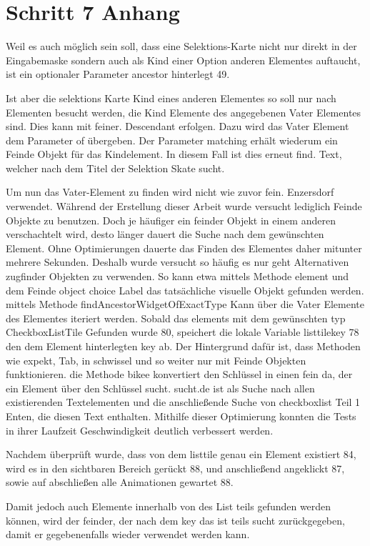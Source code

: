 \section{Schritt 7 Anhang} 
\label{appendix:Schritt7Anhang}


Weil es auch möglich sein soll, dass eine Selektions-Karte nicht nur direkt in der Eingabemaske sondern  auch als Kind einer Option anderen Elementes auftaucht, ist ein optionaler Parameter ancestor hinterlegt 49.

Ist aber die selektions Karte Kind eines anderen Elementes  so soll nur nach Elementen besucht werden, die Kind Elemente des angegebenen Vater Elementes sind. Dies kann mit feiner. Descendant erfolgen. Dazu wird das Vater Element dem Parameter of übergeben. Der Parameter matching erhält wiederum ein Feinde Objekt für das Kindelement. In diesem Fall ist dies erneut find. Text, welcher nach dem Titel der Selektion Skate sucht.


Um nun das Vater-Element zu finden wird nicht wie zuvor fein. Enzersdorf verwendet.
Während der Erstellung dieser Arbeit wurde versucht lediglich Feinde Objekte zu benutzen. Doch je häufiger ein feinder Objekt in einem anderen verschachtelt wird, desto länger dauert die Suche nach dem gewünschten Element. Ohne Optimierungen dauerte das Finden des Elementes  daher mitunter mehrere Sekunden. Deshalb wurde versucht so häufig es nur geht Alternativen  zugfinder  Objekten zu verwenden. So kann etwa mittels Methode element  und dem Feinde object choice Label das tatsächliche   visuelle Objekt gefunden werden.  mittels Methode findAncestorWidgetOfExactType Kann über die Vater Elemente des Elementes iteriert werden. Sobald das elements mit dem gewünschten typ CheckboxListTile Gefunden wurde  80,  speichert die lokale Variable listtilekey 78  den dem Element hinterlegten key ab.  Der Hintergrund dafür ist, dass Methoden wie expekt, Tab, in schwissel und so weiter nur mit Feinde Objekten funktionieren.   die Methode bikee   konvertiert den Schlüssel in einen fein da, der ein Element über den Schlüssel sucht.  sucht.de ist als Suche nach allen existierenden Textelementen und die anschließende Suche von checkboxlist Teil 1 Enten, die diesen Text enthalten. Mithilfe dieser Optimierung konnten die Tests in ihrer Laufzeit Geschwindigkeit deutlich verbessert werden.

Nachdem überprüft wurde, dass von dem listtile genau ein Element existiert 84, wird es in den sichtbaren Bereich gerückt 88, und anschließend  angeklickt 87, sowie auf abschließen alle Animationen gewartet 88.


Damit jedoch auch Elemente innerhalb von des List teils gefunden werden können,  wird der feinder, der nach dem key das ist teils sucht zurückgegeben, damit er gegebenenfalls wieder verwendet werden kann.
